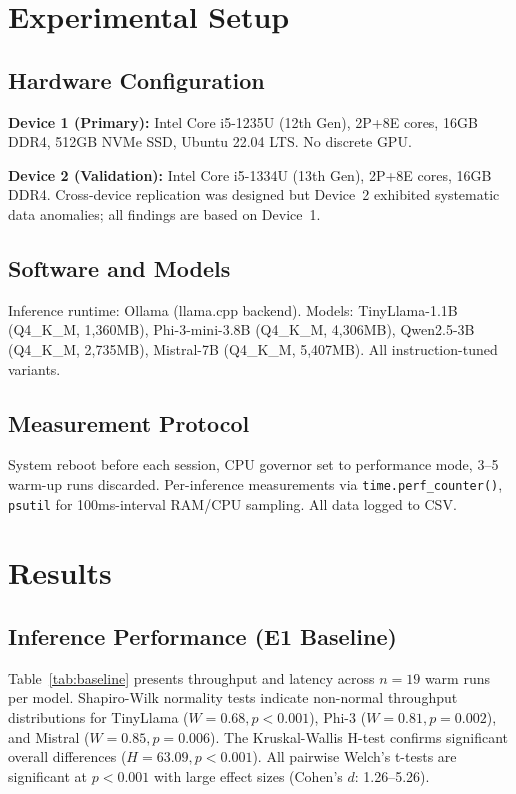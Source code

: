\documentclass[conference]{IEEEtran}
\begin{document}
\section{Experimental Setup}

\subsection{Hardware Configuration}

\textbf{Device 1 (Primary):} Intel Core i5-1235U (12th Gen), 2P+8E cores, 16GB DDR4, 512GB NVMe SSD, Ubuntu 22.04 LTS. No discrete GPU.

\textbf{Device 2 (Validation):} Intel Core i5-1334U (13th Gen), 2P+8E cores, 16GB DDR4. Cross-device replication was designed but Device~2 exhibited systematic data anomalies; all findings are based on Device~1.

\subsection{Software and Models}

Inference runtime: Ollama (llama.cpp backend). Models: TinyLlama-1.1B (Q4\_K\_M, 1,360MB), Phi-3-mini-3.8B (Q4\_K\_M, 4,306MB), Qwen2.5-3B (Q4\_K\_M, 2,735MB), Mistral-7B (Q4\_K\_M, 5,407MB). All instruction-tuned variants.

\subsection{Measurement Protocol}

System reboot before each session, CPU governor set to performance mode, 3--5 warm-up runs discarded. Per-inference measurements via \texttt{time.perf\_counter()}, \texttt{psutil} for 100ms-interval RAM/CPU sampling. All data logged to CSV.

\section{Results}

\subsection{Inference Performance (E1 Baseline)}

Table~\ref{tab:baseline} presents throughput and latency across $n{=}19$ warm runs per model. Shapiro-Wilk normality tests indicate non-normal throughput distributions for TinyLlama ($W{=}0.68, p{<}0.001$), Phi-3 ($W{=}0.81, p{=}0.002$), and Mistral ($W{=}0.85, p{=}0.006$). The Kruskal-Wallis H-test confirms significant overall differences ($H{=}63.09, p{<}0.001$). All pairwise Welch's t-tests are significant at $p{<}0.001$ with large effect sizes (Cohen's $d$: 1.26--5.26).
\end{document}

